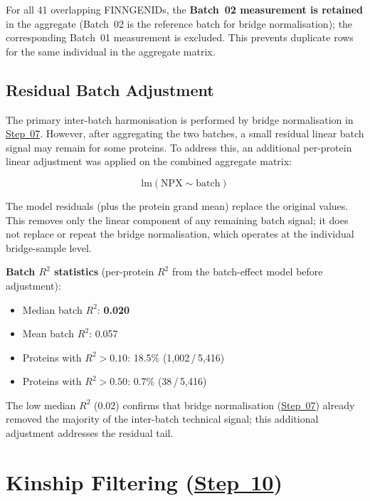 \documentclass[11pt,a4paper]{article}
\begin{document}
For all 41 overlapping FINNGENIDs, the \textbf{Batch~02 measurement is
retained} in the aggregate (Batch~02 is the reference batch for bridge
normalisation); the corresponding Batch~01 measurement is excluded. This
prevents duplicate rows for the same individual in the aggregate matrix.

\subsection{Residual Batch Adjustment}
\label{sec:residual_batch}

The primary inter-batch harmonisation is performed by bridge normalisation in
\href{https://github.com/FINNGEN/FinnGen3-proteomics-pipeline#pipeline-steps}{Step~07}. However, after aggregating the two batches, a small residual linear
batch signal may remain for some proteins. To address this, an additional
per-protein linear adjustment was applied on the combined aggregate matrix:

\[
  \text{lm}(\text{NPX} \sim \text{batch})
\]

The model residuals (plus the protein grand mean) replace the original
values. This removes only the linear component of any remaining batch
signal; it does not replace or repeat the bridge normalisation, which
operates at the individual bridge-sample level.

\textbf{Batch $R^{2}$ statistics} (per-protein $R^{2}$ from the
batch-effect model before adjustment):

\begin{itemize}
  \item Median batch $R^{2}$: \textbf{0.020}
  \item Mean batch $R^{2}$: 0.057
  \item Proteins with $R^{2} > 0.10$: 18.5\% (1,002\,/\,5,416)
  \item Proteins with $R^{2} > 0.50$: 0.7\% (38\,/\,5,416)
\end{itemize}

The low median $R^{2}$ (0.02) confirms that bridge normalisation (\href{https://github.com/FINNGEN/FinnGen3-proteomics-pipeline#pipeline-steps}{Step~07})
already removed the majority of the inter-batch technical signal; this
additional adjustment addresses the residual tail.

\section{Kinship Filtering (\href{https://github.com/FINNGEN/FinnGen3-proteomics-pipeline#pipeline-steps}{Step~10})}
\end{document}
